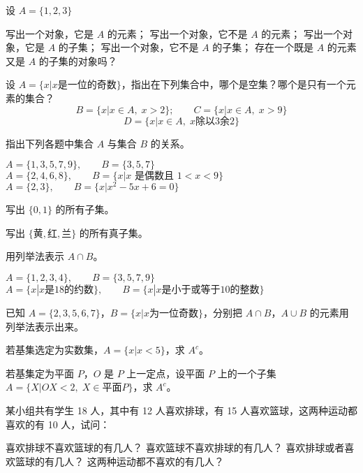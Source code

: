 \begin{Exercise}
\begin{question}
	\item 设 $A=\{1, 2, 3\}$
	\begin{tasks}
		\task 写出一个对象，它是 $A$ 的元素；
		\task 写出一个对象，它不是 $A$ 的元素；
		\task 写出一个对象，它是 $A$ 的子集；
		\task 写出一个对象，它不是 $A$ 的子集；
		\task 存在一个既是 $A$ 的元素又是 $A$ 的子集的对象吗？
	\end{tasks}
	\item 设 $A=\{x|x\text{是一位的奇数}\}$，指出在下列集合中，哪个是空集？哪个是只有一个元素的集合？
	\[B=\{x|x\in A,\; x>2\};\qquad C=\{x|x\in A,\;x>9\}\]
	\[D=\{x|x\in A,\;x\text{除以3余2}\}\]
	\item 指出下列各题中集合 $A$ 与集合 $B$ 的关系。
	\begin{tasks}
		\task $A= \{1, 3, 5,7,9\},\qquad B=\{3,5,7\}$
		\task $A= \{2, 4, 6, 8\} ,\qquad B=\{x|x\text{ 是偶数且 }1<x<9\}$
		\task $A= \{2, 3\} ,\qquad  B=\{x|x^2-5x+6=0\}$
	\end{tasks}
	
	\item 写出 $\{0, 1\}$ 的所有子集。
	\item 写出 $\{\text{黄},\text{红},\text{兰}\}$ 的所有真子集。
	\item 用列举法表示 $A\cap B$。
	\begin{tasks}
		\task $A= \{1, 2, 3, 4\} ,\qquad B= \{3, 5, 7, 9\}$
		\task $A=\{x|x\text{是18的约数}\},\qquad B=\{x|x\text{是小于或等于10的整数}\}$
	\end{tasks}
	\item 已知 $A=\{2, 3, 5, 6, 7\}$，$B=\{x|x\text{为一位奇数}\}$，分别把 $A\cap B$，$A\cup B$ 的元素用列举法表示出来。
	\item 若基集选定为实数集，$A=\{x|x<5\}$，求 $A^c$。
	\item 若基集定为平面 $P$，$O$ 是 $P$ 上一定点，设平面 $P$ 上的一个子集 $A=\{X|OX<2,\; X\in \text{平面}P\}$，求 $A^c$。
	\item 某小组共有学生 18 人，其中有 12 人喜欢排球，有 15 人喜欢篮球，这两种运动都喜欢的有 10 人，试问：
	\begin{tasks}
		\task 喜欢排球不喜欢篮球的有几人？   
		\task 喜欢篮球不喜欢排球的有几人？  
		\task 喜欢排球或者喜欢篮球的有几人？   
		\task 这两种运动都不喜欢的有几人？
	\end{tasks}
\end{question}
\end{Exercise}

